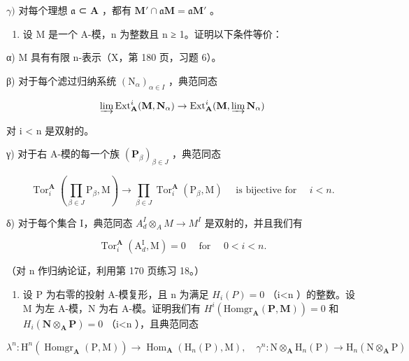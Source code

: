 \(\gamma)\) 对每个理想 \(\mathfrak{a}\) ⊂ \(\mathbf{A}\) ，都有 \(\mathbf{M}' \cap \mathfrak{a}\mathbf{M} = \mathfrak{a}\mathbf{M}'\) 。

\begin{enumerate}
\def\labelenumi{\arabic{enumi})}
\setcounter{enumi}{2}
\tightlist
\item
  设 M 是一个 A-模，n 为整数且 n ≥ 1。证明以下条件等价：
\end{enumerate}

α) M 具有有限 n-表示（X，第 180 页，习题 6）。

β) 对于每个滤过归纳系统 \((\mathrm{N}_{\alpha})_{\alpha\in I}\) ，典范同态

\[
\varinjlim \operatorname{Ext} _ {\mathbf {A}} ^ {i} (\mathbf {M}, \mathbf {N} _ {\alpha}) \rightarrow \operatorname{Ext} _ {\mathbf {A}} ^ {i} (\mathbf {M}, \varinjlim \mathbf {N} _ {\alpha})
\]

对 i \textless{} n 是双射的。

γ) 对于右 A-模的每一个族 \((\mathbf{P}_{\beta})_{\beta \in J}\) ，典范同态

\[
\operatorname{Tor} _ {i} ^ {\mathbf {A}} \left(\prod_ {\beta \in J} \mathrm{P} _ {\beta}, \mathrm{M}\right)\rightarrow \prod_ {\beta \in J} \operatorname{Tor} _ {i} ^ {\mathbf {A}} \left(\mathrm{P} _ {\beta}, \mathrm{M}\right) \quad \text { is   bijective   for } \quad i <   n.
\]

δ) 对于每个集合 I，典范同态 \(A_{d}^{I} \otimes_{A} M \to M^{I}\) 是双射的，并且我们有

\[
\operatorname{Tor} _ {i} ^ {\mathbf {A}} \left(\mathrm{A} _ {d} ^ {\mathrm{I}}, \mathrm{M}\right) = 0 \quad \text { for } \quad 0 <   i <   n.
\]

（对 n 作归纳论证，利用第 170 页练习 18。）

\begin{enumerate}
\def\labelenumi{\arabic{enumi})}
\setcounter{enumi}{3}
\tightlist
\item
  设 P 为右零的投射 A-模复形，且 n 为满足 \(H_{i}(P)=0\) （i\textless n ）的整数。设 M 为左 A-模，N 为右 A-模。证明我们有 \(H^{i}(\mathrm{Homgr}_{\mathbf{A}}(\mathbf{P},\mathbf{M}))=0\) 和 \(H_{i}(\mathbf{N}\otimes_{\mathbf{A}}\mathbf{P})=0\) （i\textless n ），且典范同态
\end{enumerate}

\[
\lambda^ {n}: \mathrm{H} ^ {n} (\operatorname{Homgr} _ {\mathbf {A}} (\mathrm{P}, \mathrm{M})) \rightarrow \operatorname{Hom} _ {\mathbf {A}} \left(\mathrm{H} _ {n} (\mathrm{P}), \mathrm{M}\right), \quad \gamma^ {n}: \mathrm{N} \otimes_ {\mathbf {A}} \mathrm{H} _ {n} (\mathrm{P}) \rightarrow \mathrm{H} _ {n} (\mathrm{N} \otimes_ {\mathbf {A}} \mathrm{P})
\]

